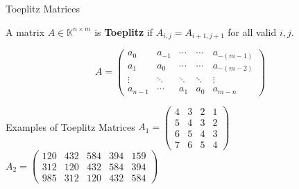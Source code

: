 \begin{frame}{Toeplitz Matrices}
  \begin{definition}
    A matrix $A \in \mathbb{K}^{n \times m}$ is \textbf{Toeplitz} if
    $A_{i,j} = A_{i+1,j+1}$ for all valid $i, j$.
  \end{definition}
  \vspace{0.5em}
  \[
    A =
    \begin{pmatrix}
      a_0    & a_{-1} & \cdots & \cdots     & a_{-(m-1)}    \\
      a_1    & a_0    & \cdots & \cdots     & a_{-(m-2)}    \\
      \vdots & \ddots & \ddots & \ddots     & \vdots        \\
      a_{n-1}& \cdots & a_1    & a_0        & a_{m-n}
    \end{pmatrix}
  \]

  \begin{block}{Examples of Toeplitz Matrices}
    \centering
    $A_{1} = \begin{pmatrix}
      4 & 3 & 2 & 1 \\
      5 & 4 & 3 & 2 \\
      6 & 5 & 4 & 3 \\
      7 & 6 & 5 & 4
    \end{pmatrix}$
    \quad
    $A_{2} = \begin{pmatrix}
      120 & 432 & 584 & 394 & 159 \\
      312 & 120 & 432 & 584 & 394 \\
      985 & 312 & 120 & 432 & 584 
    \end{pmatrix}$
  \end{block}
\end{frame}
